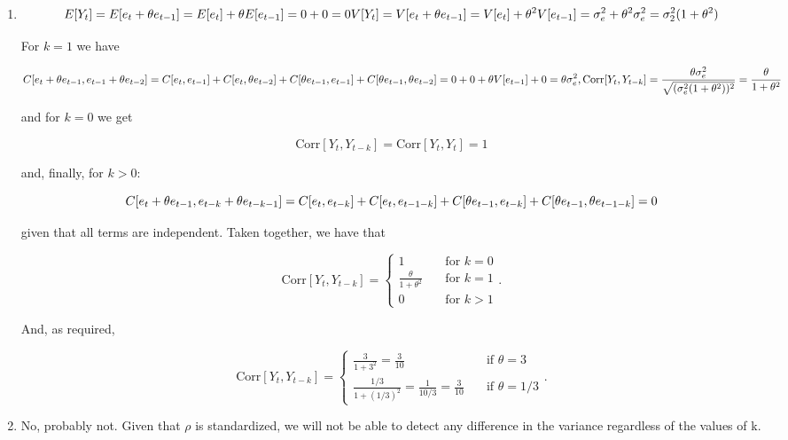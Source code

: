 \documentclass[]{book}
\begin{document}
\begin{enumerate}
\def\labelenumi{(\alph{enumi})}
\item
  \[
    E[Y_t] = E[e_t+\theta e_{t-1}] = E[e_t] + \theta E[e_{t-1}] = 0 + 0 = 0\\
    V[Y_t] = V[e_t + \theta e_{t-1}] =  V[e_t] + \theta^2 V[e_{t-1}] = \sigma_e^2 + \theta^2 \sigma_e^2 = \sigma_2^2(1 + \theta^2)\\
  \]

  For \(k = 1\) we have

  \[
    C[e_t + \theta e_{t-1}, e_{t-1} + \theta e_{t-2}] = \\
    C[e_t,e_{t-1}] + C[e_t, \theta e_{t-2}] + C[\theta e_{t-1}, e_{t-1}] + C[\theta e_{t-1}, \theta e_{t-2}] = \\
    0 + 0 + \theta V[e_{t-1}] + 0 = \theta \sigma_e^2,\\
    \text{Corr}[Y_t, Y_{t-k}] = \frac{\theta \sigma_e^2}{\sqrt{(\sigma_e^2(1+\theta^2))^2}} = \frac{\theta }{1+\theta^2}
  \]

  and for \(k = 0\) we get

  \[
    \text{Corr}[Y_t, Y_{t-k}] = \text{Corr}[Y_t, Y_t] = 1
  \]

  and, finally, for \(k > 0\):

  \[
    C[e_t + \theta e_{t-1}, e_{t-k} + \theta e_{t-k-1}] = \\
    C[e_t, e_{t-k}] + C[e_t, e_{t-1-k}] + C[\theta e_{t-1}, e_{t-k}] + C[\theta e_{t-1}, \theta e_{t-1-k}] = 0
  \]

  given that all terms are independent. Taken together, we have that

  \[ \text{Corr}[Y_t, Y_{t-k}] =
    \begin{cases}
      1                            & \quad \text{for } k = 0\\
      \frac{\theta}{1 + \theta^2}  & \quad \text{for } k = 1\\
      0                            & \quad \text{for } k > 1
    \end{cases}.
  \]

  And, as required,

  \[
    \text{Corr}[Y_t, Y_{t-k}] =
    \begin{cases}
      \frac{3}{1+3^2} = \frac{3}{10} & \quad \text{if } \theta = 3\\
      \frac{1/3}{1 + (1/3)^2} = \frac{1}{10/3} = \frac{3}{10}  & \quad \text{if } \theta = 1/3
    \end{cases}.
  \]
\item
  No, probably not. Given that \(\rho\) is standardized, we will not be
  able to detect any difference in the variance regardless of the values
  of k.
\end{enumerate}
\end{document}
